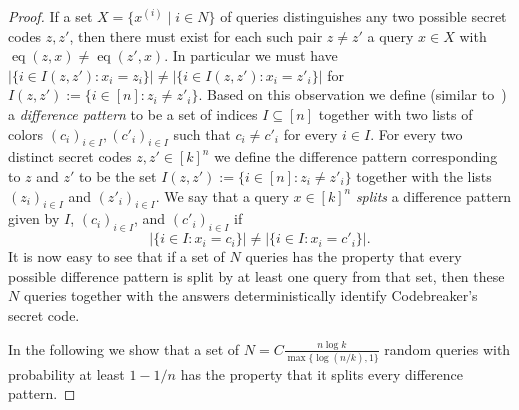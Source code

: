 \documentclass[english,a4paper,11pt]{article}
\DeclareMathOperator{\eq}{eq}
\begin{document}
{\begin{proof}
If a set $X=\{x^{(i)} \mid i \in N\}$ of queries distinguishes any two possible secret codes $z, z'$, then there must exist for each such pair $z\neq z'$ a query $x \in X$ with $\eq(z,x) \neq \eq(z',x)$. 
In particular we must have $| \{ i \in I(z,z') : x_i = z_i \} | \neq | \{ i \in I(z,z') : x_i = z'_i \} |$ for $I(z,z') := \{ i \in [n] : z_i \neq z'_i \}$.
Based on this observation we define (similar to~\cite{Chvatal83}) a \emph{difference pattern} to be a set of indices $I \subseteq [n]$ together with two lists of colors $(c_i)_{i \in I}, (c'_i)_{i \in I}$ such that $c_i \neq c'_i$ for every $i \in I$. 
For every two distinct secret codes $z, z' \in [k]^n$ we define the difference pattern corresponding to $z$ and $z'$ to be the set $I(z,z') := \{ i \in [n] : z_i \neq z'_i \}$ together with the lists $(z_i)_{i \in I}$ and $(z'_i)_{i \in I}$.
We say that a query $x \in [k]^n$ \emph{splits} a difference pattern given by $I$, $(c_i)_{i \in I}$, and $(c'_i)_{i \in I}$ if
\[
| \{ i \in I : x_i = c_i \} | \neq | \{ i \in I : x_i = c'_i \} |.
\]
It is now easy to see that if a set of $N$ queries has the property that every possible difference pattern is split by at least one query from that set, then these $N$ queries together with the answers deterministically identify Codebreaker's secret code.

In the following we show that a set of $N = C \frac{n \log k}{\max \{ \log(n/k), 1 \}}$ random queries with probability at least $1 - 1/n$ has the property that it splits every difference pattern.



\end{proof}}
\end{document}
